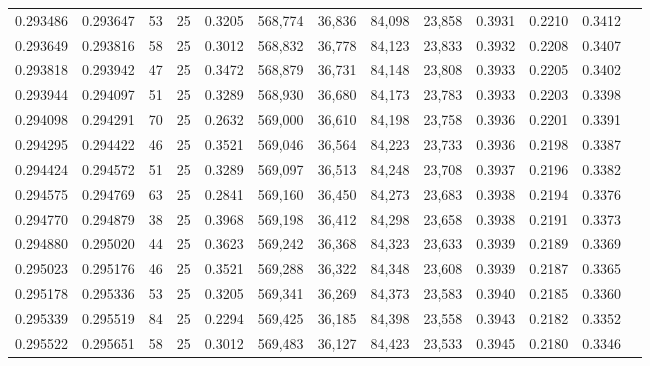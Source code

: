 \begin{tabular}{rrrrrrrrrrrrr}
0.293486 & 0.293647 &    53 &  25 &                                     0.3205 & 568,774 &  36,836 &  84,098 &  23,858 & 0.3931 & 0.2210 & 0.3412 \\
0.293649 & 0.293816 &    58 &  25 &                                     0.3012 & 568,832 &  36,778 &  84,123 &  23,833 & 0.3932 & 0.2208 & 0.3407 \\
0.293818 & 0.293942 &    47 &  25 &                                     0.3472 & 568,879 &  36,731 &  84,148 &  23,808 & 0.3933 & 0.2205 & 0.3402 \\
0.293944 & 0.294097 &    51 &  25 &                                     0.3289 & 568,930 &  36,680 &  84,173 &  23,783 & 0.3933 & 0.2203 & 0.3398 \\
0.294098 & 0.294291 &    70 &  25 &                                     0.2632 & 569,000 &  36,610 &  84,198 &  23,758 & 0.3936 & 0.2201 & 0.3391 \\
0.294295 & 0.294422 &    46 &  25 &                                     0.3521 & 569,046 &  36,564 &  84,223 &  23,733 & 0.3936 & 0.2198 & 0.3387 \\
0.294424 & 0.294572 &    51 &  25 &                                     0.3289 & 569,097 &  36,513 &  84,248 &  23,708 & 0.3937 & 0.2196 & 0.3382 \\
0.294575 & 0.294769 &    63 &  25 &                                     0.2841 & 569,160 &  36,450 &  84,273 &  23,683 & 0.3938 & 0.2194 & 0.3376 \\
0.294770 & 0.294879 &    38 &  25 &                                     0.3968 & 569,198 &  36,412 &  84,298 &  23,658 & 0.3938 & 0.2191 & 0.3373 \\
0.294880 & 0.295020 &    44 &  25 &                                     0.3623 & 569,242 &  36,368 &  84,323 &  23,633 & 0.3939 & 0.2189 & 0.3369 \\
0.295023 & 0.295176 &    46 &  25 &                                     0.3521 & 569,288 &  36,322 &  84,348 &  23,608 & 0.3939 & 0.2187 & 0.3365 \\
0.295178 & 0.295336 &    53 &  25 &                                     0.3205 & 569,341 &  36,269 &  84,373 &  23,583 & 0.3940 & 0.2185 & 0.3360 \\
0.295339 & 0.295519 &    84 &  25 &                                     0.2294 & 569,425 &  36,185 &  84,398 &  23,558 & 0.3943 & 0.2182 & 0.3352 \\
0.295522 & 0.295651 &    58 &  25 &                                     0.3012 & 569,483 &  36,127 &  84,423 &  23,533 & 0.3945 & 0.2180 & 0.3346 \\

\end{tabular}
